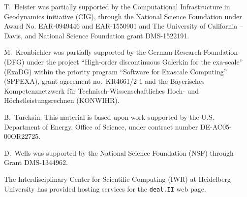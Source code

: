 \documentclass{ansarticle-preprint}
\newcommand{\specialword}[1]{\texttt{#1}}
\newcommand{\dealii}{{\specialword{deal.II}}}
\begin{document}
T.~Heister was partially supported by the Computational Infrastructure in
Geodynamics initiative (CIG), through the National Science Foundation
under Award No. EAR-0949446 and EAR-1550901 and The University of California -- Davis, and National Science Foundation grant DMS-1522191.

M.~Kronbichler was partially supported by the German Research Foundation (DFG)
under the project ``High-order discontinuous Galerkin for the exa-scale''
(ExaDG) within the priority program ``Software for Exascale Computing''
(SPPEXA), grant agreement no.~KR4661/2-1 and the Bayerisches Kompetenznetzwerk
f\"ur Technisch-Wissenschaftliches Hoch- und H\"ochstleistungsrechnen
(KONWIHR).

%
B.~Turcksin: This material is based upon work supported by the U.S. Department of
Energy, Office of Science, under contract number DE-AC05-00OR22725.

D.~Wells was supported by the National Science Foundation (NSF) through Grant
DMS-1344962.

The Interdisciplinary Center for Scientific Computing (IWR) at Heidelberg University has provided
hosting services for the \dealii{} web page.


{}

\end{document}
